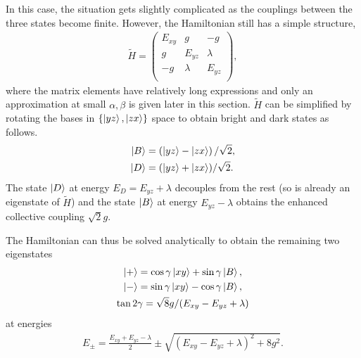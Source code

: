\documentclass[a4paper,prb,twocolumn]{revtex4-1}  %
\newcommand{\com}[1]{}
\newcommand{\az}[1]{{\color{magenta}{#1}}} %
\begin{document}
In this case, the situation gets slightly complicated as
the couplings between the three states become finite. 
However, 
the Hamiltonian still has a simple structure, 
\begin{align} 
\tilde H = 
\left(
\begin{array}{ccc}
 E_{xy} & g & -g \\
 g & E_{yz} & \lambda  \\
 -g & \lambda  & E_{yz} \\
\end{array}
\right),
\end{align}
where the matrix elements have relatively long expressions and 
only an approximation at small $\alpha,\beta$ is given later in this section.
$\tilde H$ can be simplified by rotating the bases in $\{\ket{yz},\ket{zx}\}$ space
to obtain bright and dark states
as follows.
\begin{align}
\ket{B} &= \left(\ket{yz} - \ket{zx}\right)/\sqrt{2},\\
\ket{D} &=  (\ket{yz} + \ket{zx})/\sqrt{2}.
\end{align}
The state $\ket{D}$ at energy ${E_D= E_{yz}+\lambda}$ decouples 
from the rest (so is already an eigenstate of $\tilde H$) 
and the state $\ket{B}$ at energy ${E_{yz}-\lambda}$ obtains the enhanced collective coupling $\sqrt{2} g$. 
\com{
\begin{align}
\tilde H_{Bright} = 
\left(
\begin{array}{cc}
E_{xy} & \sqrt{2} g \\
\sqrt{2} g & E_{yz}-\lambda
\end{array}
\right).
\end{align}
The Hamiltonian can be solved analytically.
}
The Hamiltonian can thus be solved analytically to
obtain the remaining two
eigenstates
\begin{gather}
\ket{+} = \cos\gamma \ket{xy} + \sin\gamma \ket{B},\\
\ket{-} = \sin\gamma \ket{xy} - \cos\gamma \ket{B},\\
\tan2\gamma = \sqrt{8}g/(E_{xy}-E_{yz}+\lambda)
\end{gather}
at 
energies
\begin{gather}
E_{\pm} = \frac{E_{xy}+E_{yz}-\lambda}{2}  \pm \sqrt{(E_{xy}-E_{yz}+\lambda)^2 + 8g^2 }.
\end{gather}
\end{document}
